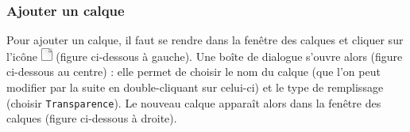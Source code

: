 




\subsubsection{Ajouter un calque}\label{Gimp2CalquesAjouter}

Pour ajouter un calque, il faut se rendre dans la fenêtre des calques et cliquer sur l'icône \includegraphics[width=.4cm]{./images/image02/CalqueAjouter} (figure ci-dessous à gauche). Une boîte de dialogue s'ouvre alors (figure ci-dessous au centre) : elle permet de choisir le nom du calque (que l'on peut modifier par la suite en double-cliquant sur celui-ci) et le type de remplissage (choisir \texttt{Transparence}). Le nouveau calque apparaît alors dans la fenêtre des calques (figure ci-dessous à droite).

\vspace{12pt}

